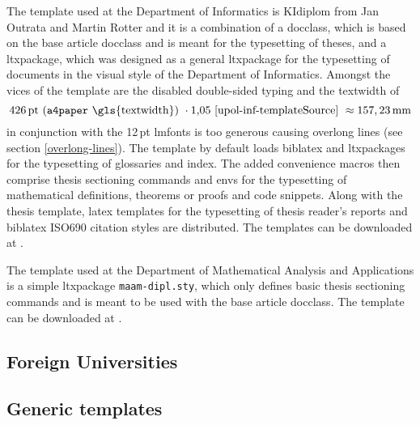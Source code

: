      The template used at the Department of Informatics is KIdiplom from Jan Outrata and Martin Rotter and it is a combination of a \gls{docclass}, which is based on the base article \gls{docclass} and is meant for the typesetting of theses, and a \gls{ltxpackage}, which was designed as a general \gls{ltxpackage} for the typesetting of documents in the visual style of the Department of Informatics. Amongst the vices of the template are the disabled double-sided typing \cite[lines~69--72]{upol-inf-templateSource} and the \gls{textwidth} of\begin{equation}
    426\text{\,pt}\text{ (\texttt{a4paper} \gls{textwidth}) }\cdot1{,}05\text{ \cite[line~81]{upol-inf-templateSource} }\approx157,23\text{\,mm}
  \end{equation} in conjunction with the 12\,pt \gls{lmfonts} is too generous \cite[lines~74--82]{upol-inf-templateSource} causing overlong lines (see section \ref{overlong-lines}). The template by default loads \gls{biblatex} and \glspl{ltxpackage} for the typesetting of glossaries and index. The added convenience macros then comprise thesis sectioning commands and \glspl{env} for the typesetting of mathematical definitions, theorems or proofs and code snippets. Along with the thesis template, \gls{latex} templates for the typesetting of thesis reader's reports and \gls{biblatex} ISO\hyph{}690 \cite{iso690-1,iso690-2} citation styles\pending{} are distributed. The templates can be downloaded at \cite{upol-inf-template}.
    
  The template used at the Department of Mathematical Analysis and Applications is a simple \gls{ltxpackage} \texttt{maam-dipl.sty}, which only defines basic thesis sectioning commands and is meant to be used with the base article \gls{docclass}. The template can be downloaded at \cite{upol-maam-template}.

  \subsection{Foreign Universities}
  \subsection{Generic templates}

